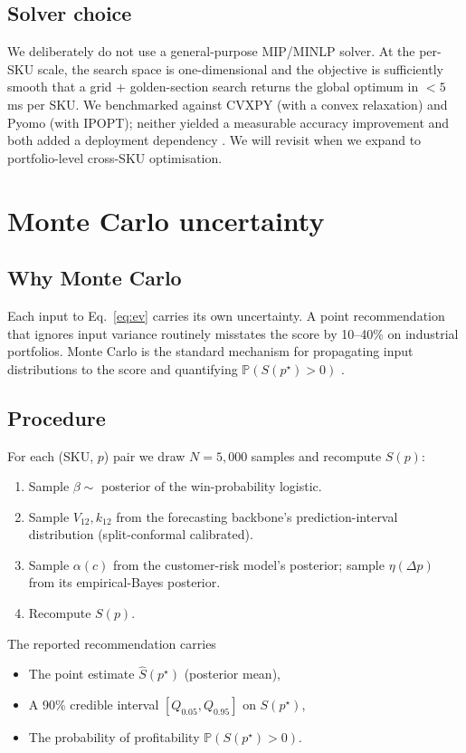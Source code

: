 \documentclass[11pt,a4paper]{article}
\newcommand{\Prob}{\mathbb{P}}
\begin{document}
\subsection{Solver choice}
We deliberately do not use a general-purpose MIP/MINLP solver. At the per-SKU scale, the search space is one-dimensional and the objective is sufficiently smooth that a grid + golden-section search returns the global optimum in $<5$ ms per SKU. We benchmarked against CVXPY (with a convex relaxation) and Pyomo (with IPOPT); neither yielded a measurable accuracy improvement and both added a deployment dependency \cite{cvxpy2016diamond,pyomo2017hart}. We will revisit when we expand to portfolio-level cross-SKU optimisation.

\section{Monte Carlo uncertainty}

\subsection{Why Monte Carlo}
Each input to Eq.~\ref{eq:ev} carries its own uncertainty. A point recommendation that ignores input variance routinely misstates the score by 10--40\% on industrial portfolios. Monte Carlo is the standard mechanism for propagating input distributions to the score and quantifying $\Prob(S(p^\star) > 0)$ \cite{monetizely2025mc,fastercapital2024mc}.

\subsection{Procedure}
For each (SKU, $p$) pair we draw $N = 5{,}000$ samples and recompute $S(p)$:
\begin{enumerate}[leftmargin=2em,itemsep=2pt]
  \item Sample $\beta \sim$ posterior of the win-probability logistic.
  \item Sample $V_{12}, k_{12}$ from the forecasting backbone's prediction-interval distribution (split-conformal calibrated).
  \item Sample $\alpha(c)$ from the customer-risk model's posterior; sample $\eta(\Delta p)$ from its empirical-Bayes posterior.
  \item Recompute $S(p)$.
\end{enumerate}
The reported recommendation carries
\begin{itemize}[leftmargin=2em,itemsep=2pt]
  \item The point estimate $\hat S(p^\star)$ (posterior mean),
  \item A 90\% credible interval $[Q_{0.05}, Q_{0.95}]$ on $S(p^\star)$,
  \item The probability of profitability $\Prob(S(p^\star) > 0)$.
\end{itemize}
\end{document}
